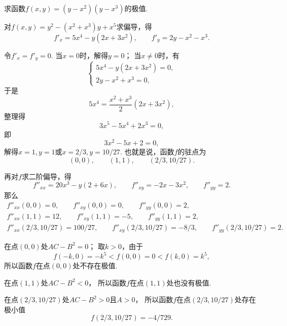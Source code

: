 \begin{example}
求函数\(f(x,y) = (y-x^2)(y-x^3)\)的极值.
\begin{solution}
对\(f(x,y) = y^2 - (x^2+x^3) y + x^5\)求偏导，得\begin{equation*}
	f'_x = 5x^4 - y(2x+3x^2),
	\qquad
	f'_y = 2y - x^2 - x^3.
\end{equation*}

令\(f'_x = f'_y = 0\).
当\(x=0\)时，解得\(y = 0\)；
当\(x\neq0\)时，有\begin{equation*}
	\begin{cases}
		5x^4-y(2x+3x^2) = 0, \\
		2y-x^2+x^3 = 0,
	\end{cases}
\end{equation*}
于是\begin{equation*}
	5x^4 = \frac{x^2+x^3}{2}(2x+3x^2),
\end{equation*}
整理得\begin{equation*}
	3x^5-5x^4+2x^3=0,
\end{equation*}
即\begin{equation*}
	3x^2-5x+2=0,
\end{equation*}
解得\(x=1,y=1\)或\(x=2/3,y=10/27\).
也就是说，函数\(f\)的驻点为\begin{equation*}
	(0,0), \qquad
	(1,1), \qquad
	(2/3,10/27).
\end{equation*}

再对\(f\)求二阶偏导，得\begin{equation*}
	f''_{xx} = 20x^3 - y(2+6x),
	\qquad
	f''_{xy} = -2x-3x^2,
	\qquad
	f''_{yy} = 2.
\end{equation*}
那么
\begin{gather*}
	f''_{xx}(0,0) = 0,
	\qquad
	f''_{xy}(0,0) = 0,
	\qquad
	f''_{yy}(0,0) = 2, \\
	f''_{xx}(1,1) = 12,
	\qquad
	f''_{xy}(1,1) = -5,
	\qquad
	f''_{yy}(1,1) = 2, \\
	f''_{xx}(2/3,10/27) = 100/27,
	\qquad
	f''_{xy}(2/3,10/27) = -8/3,
	\qquad
	f''_{yy}(2/3,10/27) = 2.
\end{gather*}

在点\((0,0)\)处\(AC-B^2 = 0\)；
取\(k>0\)，由于\begin{equation*}
f(-k,0) = -k^5 < f(0,0) = 0 < f(k,0) = k^5,
\end{equation*}所以函数\(f\)在点\((0,0)\)处不存在极值.

在点\((1,1)\)处\(AC-B^2 < 0\)，
所以函数\(f\)在点\((1,1)\)处也没有极值.

在点\((2/3,10/27)\)处\(AC-B^2 > 0\)且\(A>0\)，
所以函数\(f\)在点\((2/3,10/27)\)处存在极小值\begin{equation*}
	f(2/3,10/27) = -4/729.
\end{equation*}
\end{solution}
\end{example}

